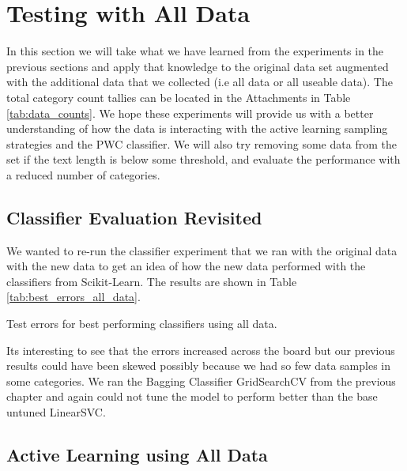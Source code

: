 \chapter{Testing with All Data}
\label{sec:proper_vectorization}

In this section we will take what we have learned from the experiments in the previous sections and apply that knowledge to the original data set augmented with the additional data that we collected (i.e all data or all useable data). The total category count tallies can be located in the Attachments in Table \ref{tab:data_counts}. We hope these experiments will provide us with a better understanding of how the data is interacting with the active learning sampling strategies and the PWC classifier. We will also try removing some data from the set if the text length is below some threshold, and evaluate the performance with a reduced number of categories.

\section{Classifier Evaluation Revisited}

We wanted to re-run the classifier experiment that we ran with the original data with the new data to get an idea of how the new data performed with the classifiers from Scikit-Learn. The results are shown in Table \ref{tab:best_errors_all_data}.

\begin{table}[ht]
    \centering
    \caption{Test errors for best performing classifiers using all data.}
    
    \label{tab:best_errors_all_data}
\end{table}

Its interesting to see that the errors increased across the board but our previous results could have been skewed possibly because we had so few data samples in some categories. We ran the Bagging Classifier GridSearchCV from the previous chapter and again could not tune the model to perform better than the base untuned LinearSVC.

\section{Active Learning using All Data}

